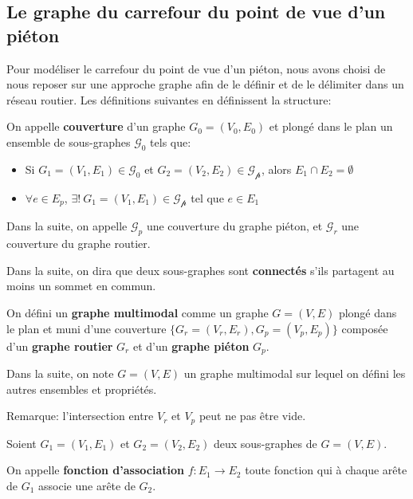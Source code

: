 \subsection{Le graphe du carrefour du point de vue d'un piéton}

\label{sec:modelisation_definitions}

Pour modéliser le carrefour du point de vue d'un piéton, nous avons choisi de nous reposer sur une approche graphe afin de le définir et de le délimiter dans un réseau routier. Les définitions suivantes en définissent la structure:

\begin{definition}
    On appelle \textbf{couverture} d'un graphe $G_0 = (V_0,E_0)$ et plongé dans le plan un ensemble de sous-graphes $\mathcal{G_0}$ tels que:
    \begin{itemize}
        \item Si $G_1=(V_1, E_1) \in \mathcal{G_0}$ et $G_2=(V_2, E_2) \in \mathcal{G_p}$, alors $E_1 \cap E_2 = \emptyset$
        \item $\forall e \in E_p$, $\exists!~G_1=(V_1, E_1) \in \mathcal{G_p}$ tel que $e \in E_1$
    \end{itemize}
    
    Dans la suite, on appelle $\mathcal{G}_p$ une couverture du graphe piéton, et $\mathcal{G}_r$ une couverture du graphe routier.
    
    Dans la suite, on dira que deux sous-graphes sont \textbf{connectés} s'ils partagent au moins un sommet en commun.
\end{definition}

\begin{definition}
    On défini un \textbf{graphe multimodal} comme un graphe $G = (V,E)$ plongé dans le plan et muni d'une couverture $\{G_r=(V_r, E_r), G_p = (V_p, E_p)\}$ composée d'un \textbf{graphe routier} $G_r$ et d'un \textbf{graphe piéton} $G_p$.

    Dans la suite, on note $G = (V,E)$ un graphe multimodal sur lequel on défini les autres ensembles et propriétés.
\end{definition}

\noindent
Remarque: l'intersection entre $V_r$ et $V_p$ peut ne pas être vide.

\begin{definition}
    Soient $G_1=(V_1, E_1)$ et $G_2=(V_2, E_2)$ deux sous-graphes de $G=(V, E)$.
    
    On appelle \textbf{fonction d'association} $f: E_1 \rightarrow E_2$ toute fonction qui à chaque arête de $G_1$ associe une arête de $G_2$.
\end{definition}

